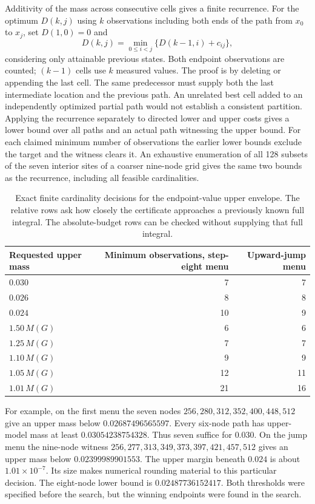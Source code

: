 \documentclass[12pt,letterpaper]{article}
\begin{document}
Additivity of the mass across consecutive cells gives a finite recurrence. For the optimum \(D(k,j)\) using \(k\) observations including both ends of the path from \(x_0\) to \(x_j\), set \(D(1,0)=0\) and
\[
 D(k,j)=\min_{0\le i<j}\{D(k-1,i)+c_{ij}\},
\]
considering only attainable previous states. Both endpoint observations are counted; \((k-1)\) cells use \(k\) measured values. The proof is by deleting or appending the last cell. The same predecessor must supply both the last intermediate location and the previous path. An unrelated best cell added to an independently optimized partial path would not establish a consistent partition. Applying the recurrence separately to directed lower and upper costs gives a lower bound over all paths and an actual path witnessing the upper bound. For each claimed minimum number of observations the earlier lower bounds exclude the target and the witness clears it. An exhaustive enumeration of all 128 subsets of the seven interior sites of a coarser nine-node grid gives the same two bounds as the recurrence, including all feasible cardinalities.

\begin{table}[htbp]\centering\small
\begin{tabular}{@{}lrr@{}}
\toprule
Requested upper mass & Minimum observations, step-eight menu & Upward-jump menu\\ \midrule
\(0.030\) & 7 & 7\\
\(0.026\) & 8 & 8\\
\(0.024\) & 10 & 9\\
\(1.50\,M(G)\) & 6 & 6\\
\(1.25\,M(G)\) & 7 & 7\\
\(1.10\,M(G)\) & 9 & 9\\
\(1.05\,M(G)\) & 12 & 11\\
\(1.01\,M(G)\) & 21 & 16\\
\bottomrule
\end{tabular}
\caption{Exact finite cardinality decisions for the endpoint-value upper envelope. The relative rows ask how closely the certificate approaches a previously known full integral. The absolute-budget rows can be checked without supplying that full integral.}
\end{table}

For example, on the first menu the seven nodes \(256,280,312,352,400,448,512\) give an upper mass below \(0.02687496565597\). Every six-node path has upper-model mass at least \(0.03054238754328\). Thus seven suffice for \(0.030\). On the jump menu the nine-node witness \(256,277,313,349,373,397,421,457,512\) gives an upper mass below \(0.02399989901553\). The upper margin beneath \(0.024\) is about \(1.01\times10^{-7}\). Its size makes numerical rounding material to this particular decision. The eight-node lower bound is \(0.02487736152417\). Both thresholds were specified before the search, but the winning endpoints were found in the search.
\end{document}

